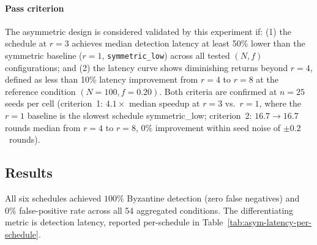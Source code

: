 \documentclass[journal,10pt,twocolumn]{IEEEtran}
\begin{document}
\paragraph{Pass criterion}
The asymmetric design is considered validated by this experiment if:
(1) the schedule at $r=3$ achieves median detection latency at least 50\% lower than the symmetric baseline ($r=1$, \texttt{symmetric\_low}) across all tested $(N, f)$ configurations; and
(2) the latency curve shows diminishing returns beyond $r=4$, defined as less than 10\% latency improvement from $r=4$ to $r=8$ at the reference condition $(N=100, f=0.20)$.
Both criteria are confirmed at $n{=}25$ seeds per cell (criterion~1: $4.1\times$ median speedup at $r=3$ vs.~$r=1$, where the $r=1$ baseline is the slowest schedule symmetric\_low; criterion~2: $16.7 \to 16.7$ rounds median from $r=4$ to $r=8$, $0\%$ improvement within seed noise of $\pm 0.2$~rounds).

\subsection{Results}

All six schedules achieved $100\%$ Byzantine detection (zero false
negatives) and $0\%$ false-positive rate across all 54 aggregated
conditions. The differentiating metric is detection latency,
reported per-schedule in Table~\ref{tab:asym-latency-per-schedule}.
\end{document}
